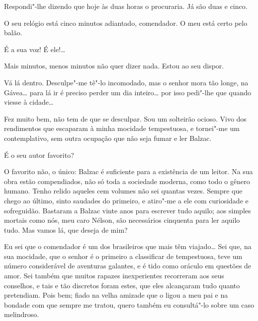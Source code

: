   Respondi"-lhe dizendo que hoje às duas horas o
procuraria.  Já são duas e
cinco.


   O seu relógio
está cinco minutos adiantado, comendador. O meu está certo pelo balão.

   É a sua voz! É ele!\ldots{} 

  Mais minutos, menos minutos não quer dizer nada.
 Estou
ao seu dispor.

  Vá lá dentro.
Desculpe"-me tê"-lo incomodado, mas o senhor mora tão longe, na Gávea\ldots{} 
para lá ir é preciso perder um dia inteiro\ldots{} por isso pedi"-lhe que
quando viesse à cidade\ldots{}

  Fez muito bem, não tem de que se desculpar. Sou um
solteirão ocioso. Vivo dos rendimentos que escaparam à minha mocidade
tempestuosa, e tornei"-me um contemplativo, sem outra ocupação que não
seja fumar e ler Balzac.

  É o seu
autor favorito?  

  O favorito não, o único: Balzac é suficiente para a
existência de um leitor. Na sua obra estão compendiados, não só toda a
sociedade moderna, como todo o gênero humano. Tenho relido aqueles cem
volumes não sei quantas vezes. Sempre que chego ao último, sinto
saudades do primeiro, e atiro"-me a ele com curiosidade e sofreguidão.
Bastaram a Balzac vinte anos para escrever tudo aquilo; aos simples
mortais como nós, meu caro Nélson, são necessários cinquenta para ler
aquilo tudo. Mas vamos lá, que deseja de mim? 

  Eu sei que o comendador é um dos brasileiros
que mais têm viajado\ldots{} Sei que, na sua mocidade, que o senhor é o
primeiro a classificar de tempestuosa, teve um número considerável de
aventuras galantes, e é tido como oráculo em questões de amor.
Sei também que muitos rapazes inexperientes recorreram aos seus
conselhos, e tais e tão discretos foram estes, que eles alcançaram tudo
quanto pretendiam. Pois bem; fiado na velha amizade que o ligou a meu
pai e na bondade com que sempre me tratou, quero também eu consultá"-lo
sobre um caso melindroso.

